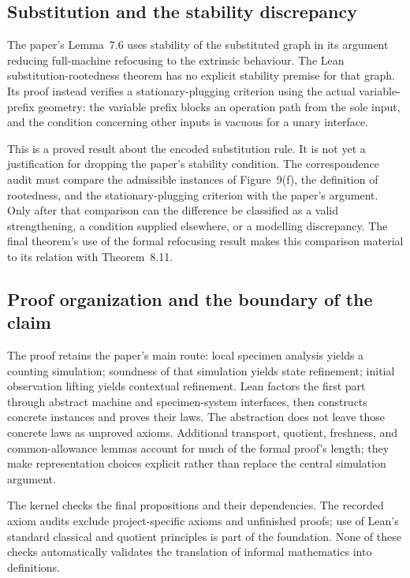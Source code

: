 \subsection{Substitution and the stability discrepancy}
\label{sec:stability-correspondence-audit}

The paper's Lemma~7.6 uses stability of the substituted graph in its argument
reducing full-machine refocusing to the extrinsic behaviour. The Lean
substitution-rootedness theorem has no explicit stability premise for that
graph. Its proof instead verifies a stationary-plugging criterion using the
actual variable-prefix geometry: the variable prefix blocks an operation path
from the sole input, and the condition concerning other inputs is vacuous
for a unary interface.

This is a proved result about the encoded substitution rule. It is not yet a
justification for dropping the paper's stability condition. The correspondence
audit must compare the admissible instances of Figure~9(f), the definition of
rootedness, and the stationary-plugging criterion with the paper's argument.
Only after that comparison can the difference be classified as a valid
strengthening, a condition supplied elsewhere, or a modelling discrepancy.
The final theorem's use of the formal refocusing result makes this comparison
material to its relation with Theorem~8.11.

\subsection{Proof organization and the boundary of the claim}

The proof retains the paper's main route: local specimen analysis yields a
counting simulation; soundness of that simulation yields state refinement;
initial observation lifting yields contextual refinement. Lean factors the
first part through abstract machine and specimen-system interfaces, then
constructs concrete instances and proves their laws. The abstraction does not
leave those concrete laws as unproved axioms. Additional transport, quotient,
freshness, and common-allowance lemmas account for much of the formal proof's
length; they make representation choices explicit rather than replace the
central simulation argument.

The kernel checks the final propositions and their dependencies. The recorded
axiom audits exclude project-specific axioms and unfinished proofs; use of
Lean's standard classical and quotient principles is part of the foundation.
None of these checks automatically validates the translation of informal
mathematics into definitions.

